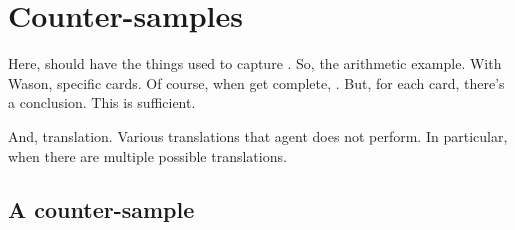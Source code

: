 \chapter{Counter-samples}
\label{cha:ces}




\begin{note}
  Here, should have the things used to capture \tCV{}.
  So, the arithmetic example.
  With Wason, specific cards.
  Of course, when get complete, \wit{}.
  But, for each card, there's a conclusion.
  This is sufficient.

  And, translation.
  Various translations that agent does not perform.
  In particular, when there are multiple possible translations.
\end{note}



\section{A counter-sample}

